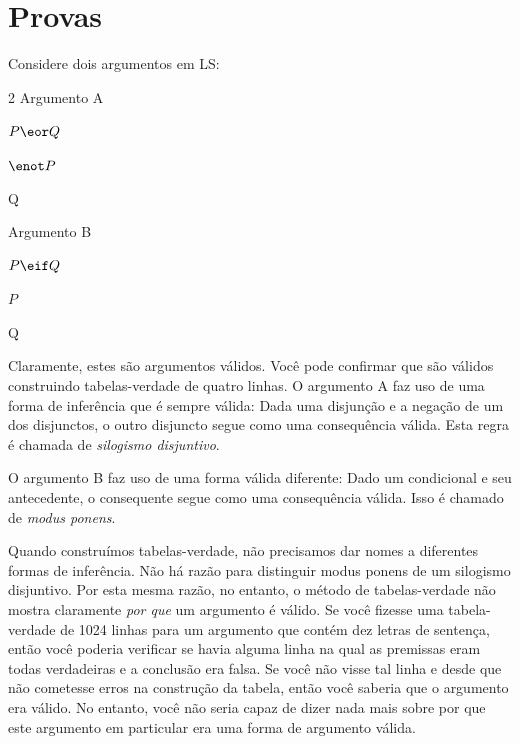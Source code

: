 \chapter{Provas}
\label{ch.proofs}

Considere dois argumentos em LS:

\begin{multicols}{2}
Argumento A
\begin{earg}
\item[] $P \eor Q$
\item[] $\enot P$
\item[\therefore] Q
\end{earg}

Argumento B
\begin{earg}
\item[] $P \eif Q$
\item[] $P$
\item[\therefore] Q
\end{earg}

\end{multicols}

Claramente, estes são argumentos válidos. Você pode confirmar que são válidos construindo tabelas-verdade de quatro linhas. O argumento A faz uso de uma forma de inferência que é sempre válida: Dada uma disjunção e a negação de um dos disjunctos, o outro disjuncto segue como uma consequência válida. Esta regra é chamada de \emph{silogismo disjuntivo}.

O argumento B faz uso de uma forma válida diferente: Dado um condicional e seu antecedente, o consequente segue como uma consequência válida. Isso é chamado de \emph{modus ponens}.

Quando construímos tabelas-verdade, não precisamos dar nomes a diferentes formas de inferência. Não há razão para distinguir modus ponens de um silogismo disjuntivo. Por esta mesma razão, no entanto, o método de tabelas-verdade não mostra claramente \emph{por que} um argumento é válido. Se você fizesse uma tabela-verdade de 1024 linhas para um argumento que contém dez letras de sentença, então você poderia verificar se havia alguma linha na qual as premissas eram todas verdadeiras e a conclusão era falsa. Se você não visse tal linha e desde que não cometesse erros na construção da tabela, então você saberia que o argumento era válido. No entanto, você não seria capaz de dizer nada mais sobre por que este argumento em particular era uma forma de argumento válida.

